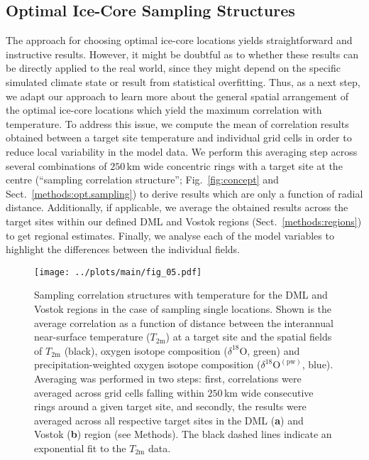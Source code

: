 \documentclass[draft]{agujournal2019}
\begin{document}
\subsection{Optimal Ice-Core Sampling Structures}
\label{results:optim-spacing}

The approach for choosing optimal ice-core locations yields straightforward and
instructive results. However, it might be doubtful as to whether these results
can be directly applied to the real world, since they might depend on the
specific simulated climate state or result from statistical overfitting. Thus,
as a next step, we adapt our approach to learn more about the general spatial
arrangement of the optimal ice-core locations which yield the maximum
correlation with temperature. To address this issue, we compute the mean of
correlation results obtained between a target site temperature and individual
grid cells in order to reduce local variability in the model data. We perform
this averaging step across several combinations of $250$\,km wide concentric
rings with a target site at the centre (``sampling correlation structure'';
Fig.~\ref{fig:concept} and Sect.~\ref{methods:opt.sampling}) to derive results
which are only a function of radial distance. Additionally, if applicable,
we average the obtained results across the target sites within our defined DML
and Vostok regions (Sect.~\ref{methods:regions}) to get regional
estimates. Finally, we analyse each of the model variables to highlight the
differences between the individual fields.

\begin{figure*}[t]%
\centering
\texttt{[image: ../plots/main/fig\_05.pdf]}
\caption{%
  Sampling correlation structures with temperature for the DML and Vostok
  regions in the case of sampling single locations. Shown is the average
  correlation as a function of distance between the interannual near-surface
  temperature ($T_{2\mathrm{m}}$) at a target site and the spatial fields of
  $T_{2\mathrm{m}}$ (black), oxygen isotope composition
  ($\delta^{18}\mathrm{O}$, green) and precipitation-weighted oxygen isotope
  composition ($\delta^{18}\mathrm{O}^{\mathrm{(pw)}}$, blue). Averaging was
  performed in two steps: first, correlations were averaged across grid cells
  falling within $250$\,km wide consecutive rings around a given target site,
  and secondly, the results were averaged across all respective target sites in
  the DML (\textbf{a}) and Vostok (\textbf{b}) region (see Methods). The black
  dashed lines indicate an exponential fit to the $T_{2\mathrm{m}}$ data.}
\label{fig:avg.cor.structure}%
\end{figure*}%
\end{document}
